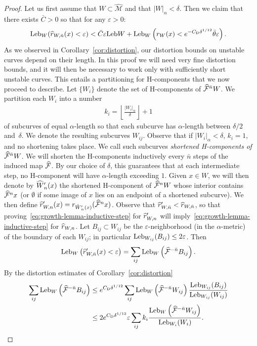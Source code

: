 \documentclass[AHL, Unicode, longabstracts,published]{cedram}
\newcommand{\eps}{\varepsilon}
\newcommand{\cm}{\mathcal{F}}
\newcommand{\csp}{\mathcal{M}}
\newcommand{\cmp}{\hat\cm}
\newcommand{\cspi}{\widehat{\csp}}
\newcommand{\adm}{_{\alpha^{+}}}
\newcommand{\admName}{\alpha^{+}}
\newcommand{\Leb}{\textup{Leb}}
\newcommand{\Cdist}{C_\mathrm{D}}
\renewcommand{\admName}{\alpha}
\renewcommand{\adm}{_{\alpha}}
\let\oldhat\hat
\renewcommand*{\hat}[1]{\mathchoice{\widehat{#1}}{\widehat{#1}}{\oldhat{#1}}{\oldhat{#1}}}
\begin{document}
\begin{proof}
Let us first assume that $W\subset \cspi$ and that $|W|\adm < \delta$. Then we claim that there exists $\bar C > 0$ so that for any $\eps > 0$:
\begin{align}\label{eq:growth-lemma-inductive-step}
\Leb_{W}(\hat r_{W,\bar n}(x) < \eps) < \bar C\eps\Leb W + \Leb_{W}\left(r_{W}(x) < e^{-\Cdist\delta^{1/12}}\bar\theta\eps\right).
\end{align}
As we observed in Corollary~\ref{cor:distortion}, our distortion bounds on unstable curves depend on their length. In this proof we will need very fine distortion bounds, and it will then be necessary to work only with sufficiently short unstable curves. This entails a partitioning for H-components that we now proceed to describe. Let $\{W_{i}\}$ denote the set of H-components of $\cmp^{\bar n}W$. We partition each $W_{i}$ into a number
\begin{align*}
k_i = \left\lfloor \frac{|W_{i}|\adm}{\delta}\right\rfloor+1
\end{align*}
of subcurves of equal $\admName$-length so that each subcurve has $\admName$-length between $\delta/2$ and~$\delta$. We denote the resulting subcurves $W_{ij}$. Observe that if $|W_{i}|\adm < \delta$, $k_{i} = 1$, and no shortening takes place. We call such subcurves
\emph{shortened H-components of $\cmp^{\bar n}W$}. We will shorten the H-components inductively every $\bar n$ steps of the induced map $\cmp$. By our choice of $\delta$, this guarantees that at each intermediate step, no H-component will have $\admName$-length exceeding $1$. Given $x\in W$, we will then denote by $\hat W'_{n}(x)$ the shortened H-component of $\cmp^{n}W$ whose interior contains $\cmp^{n}x$ (or $\emptyset$ if some image of $x$ lies on an endpoint of a shortened subcurve). We then define $\hat r'_{W,n}(x) = r_{\hat W'_{n}(x)}(\cmp^{n}x)$. Observe that $\hat r'_{W,\bar n} < \hat r_{W,\bar n}$, so that proving~\eqref{eq:growth-lemma-inductive-step} for $\hat r'_{W,n}$ will imply~\eqref{eq:growth-lemma-inductive-step} for $\hat r_{W,n}$. Let $B_{ij}\subset W_{ij}$ be the $\eps$-neighborhood (in the $\admName$-metric) of the boundary of each $W_{ij}$; in particular $\Leb_{W_{ij}}(B_{ij}) \leq 2\eps$. Then
\begin{align*}
\Leb_{W}\left(\hat r'_{W,\bar n}(x) < \eps\right) = \sum_{ij}\Leb_{W}\left(\cmp^{-\bar n}B_{ij}\right).
\end{align*}
By the distortion estimates of Corollary~\ref{cor:distortion}
\begin{align*}
\sum_{ij}\Leb_{W}\left(\cmp^{-\bar n}B_{ij}\right) &\le e^{\Cdist\delta^{1/12}}\sum_{ij}\Leb_{W}\left(\cmp^{-\bar n}W_{ij}\right)
\frac {\Leb_{W_{ij}}(B_{ij})}{\Leb_{W_{ij}}(W_{ij})}\\
& \le 2e^{\Cdist\delta^{1/12}}\eps \sum_{ij} k_{i}\frac{\Leb_{W}\left(\cmp^{-\bar n}W_{ij}\right)}{\Leb_{W_{i}}(W_{i})}.
\end{align*}


\end{proof}
\end{document}
